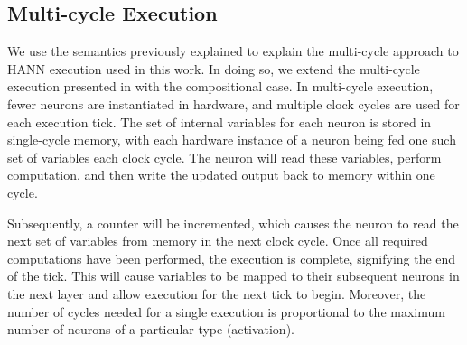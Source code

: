 


\subsection{Multi-cycle Execution}
We use the semantics previously explained to explain the multi-cycle approach to HANN execution used in this work. In doing so, we extend the multi-cycle execution presented in \cite{allen_compositional_2019-1} with the compositional case. In multi-cycle execution, fewer neurons are instantiated in hardware, and multiple clock cycles are used for each execution tick. The set of internal variables for each neuron is stored in single-cycle memory, with each hardware instance of a neuron being fed one such set of variables each clock cycle. The neuron will read these variables, perform computation, and then write the updated output back to memory within one cycle. 

Subsequently, a counter will be incremented, which causes the neuron to read the next set of variables from memory in the next clock cycle. Once all required computations have been performed, the execution is complete, signifying the end of the tick. This will cause variables to be mapped to their subsequent neurons in the next layer and allow execution for the next tick to begin. Moreover, the number of cycles needed for a single execution is proportional to the maximum number of neurons of a particular type (activation).

